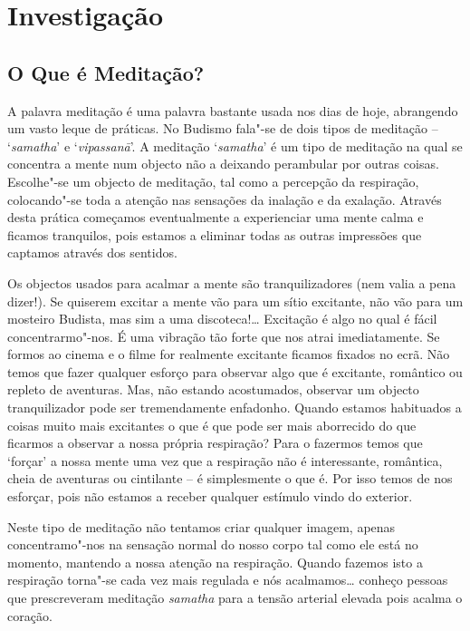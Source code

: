 \part{Investigação}

\chapter{O Que é Meditação?}

A palavra meditação é uma palavra bastante usada nos dias de hoje,
abrangendo um vasto leque de práticas. No Budismo fala"-se de dois tipos
de meditação -- `\emph{samatha}' e `\emph{vipassanā}'. A meditação
`\emph{samatha}' é um tipo de meditação na qual se concentra a mente num
objecto não a deixando perambular por outras coisas. Escolhe"-se um
objecto de meditação, tal como a percepção da respiração, colocando"-se
toda a atenção nas sensações da inalação e da exalação. Através desta
prática começamos eventualmente a experienciar uma mente calma e ficamos
tranquilos, pois estamos a eliminar todas as outras impressões que
captamos através dos sentidos.

Os objectos usados para acalmar a mente são tranquilizadores (nem valia
a pena dizer!). Se quiserem excitar a mente vão para um sítio excitante,
não vão para um mosteiro Budista, mas sim a uma discoteca!\ldots{} Excitação
é algo no qual é fácil concentrarmo"-nos. É uma vibração tão forte que
nos atrai imediatamente. Se formos ao cinema e o filme for realmente
excitante ficamos fixados no ecrã. Não temos que fazer qualquer esforço
para observar algo que é excitante, romântico ou repleto de aventuras.
Mas, não estando acostumados, observar um objecto tranquilizador pode
ser tremendamente enfadonho. Quando estamos habituados a coisas muito
mais excitantes o que é que pode ser mais aborrecido do que ficarmos a
observar a nossa própria respiração? Para o
fazermos temos que `forçar' a nossa mente uma vez que a respiração não é
interessante, romântica, cheia de aventuras ou cintilante -- é
simplesmente o que é. Por isso temos de nos esforçar, pois não estamos a
receber qualquer estímulo vindo do exterior.

Neste tipo de meditação não tentamos criar qualquer imagem, apenas
concentramo"-nos na sensação normal do nosso corpo tal como ele está no
momento, mantendo a nossa atenção na respiração. Quando fazemos isto a
respiração torna"-se cada vez mais regulada e nós acalmamos\ldots{}
conheço pessoas que prescreveram meditação \emph{samatha} para a tensão
arterial elevada pois acalma o coração.


